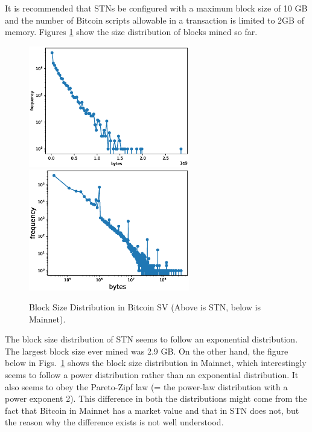 \documentclass[graybox]{svmult}
\begin{document}
It is recommended that STNs be configured with a maximum block size of 10 GB and the number of Bitcoin scripts allowable in a transaction is limited to 2GB of memory.
Figures \ref{fig:block_size} show the size distribution of blocks mined so far. 
%
\begin{figure}[t]
  \vspace{-35mm}
  \begin{center}
    \includegraphics[width=70mm]{bsv_stn-block_bytes-semilogy2.eps}
    \includegraphics[width=70mm]{bsv_mainnet-block_bytes-loglog.eps}
  \end{center}
  \vspace{35mm}
  \caption{Block Size Distribution in Bitcoin SV (Above is STN, below is Mainnet).}
  \label{fig:block_size}
\end{figure}
%
The block size distribution of STN seems to follow an exponential distribution.
The largest block size ever mined was 2.9 GB.
On the other hand, the figure below in Figs.~\ref{fig:block_size} shows the block size distribution in Mainnet, which interestingly seems to follow a power distribution rather than an exponential distribution.
It also seems to obey the Pareto-Zipf law (= the power-law distribution with a power exponent 2). 
This difference in both the distributions might come from the fact that Bitcoin in Mainnet has a market value and that in STN does not, but the reason why the difference exists is not well understood. 
\end{document}

